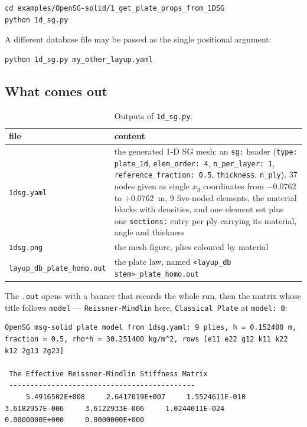 \begin{lstlisting}[style=shellst]
cd examples/OpenSG-solid/1_get_plate_props_from_1DSG
python 1d_sg.py
\end{lstlisting}

A different database file may be passed as the single positional argument:

\begin{lstlisting}[style=shellst]
python 1d_sg.py my_other_layup.yaml
\end{lstlisting}

\subsection{What comes out}

\begin{table}[htbp]
\centering
\small
\begin{tabular}{lp{9.6cm}}
\toprule
file & content \\
\midrule
\texttt{1dsg.yaml} & the generated 1-D SG mesh: an \texttt{sg:} header
  (\texttt{type: plate\_1d}, \texttt{elem\_order: 4}, \texttt{n\_per\_layer: 1},
  \texttt{reference\_fraction: 0.5}, \texttt{thickness}, \texttt{n\_ply}), 37
  nodes given as single $x_3$ coordinates from $-0.0762$ to $+0.0762$~m, 9
  five-noded elements, the material blocks with densities, and one element set
  plus one \texttt{sections:} entry per ply carrying its material, angle and
  thickness \\
\texttt{1dsg.png} & the mesh figure, plies coloured by material \\
\texttt{layup\_db\_plate\_homo.out} & the plate law, named
  \texttt{<layup\_db stem>\_plate\_homo.out} \\
\bottomrule
\end{tabular}
\caption{Outputs of \texttt{1d\_sg.py}.}
\label{tab:solid-ex1out}
\end{table}

The \texttt{.out} opens with a banner that records the whole run, then the
matrix whose title follows \texttt{model} --- \texttt{Reissner-Mindlin}
here, \texttt{Classical Plate} at \texttt{model: 0}:

\begin{lstlisting}[style=shellst,basicstyle=\ttfamily\tiny,breaklines=true]
 OpenSG msg-solid plate model from 1dsg.yaml: 9 plies, h = 0.152400 m, fraction = 0.5, rho*h = 30.251400 kg/m^2, rows [e11 e22 g12 k11 k22 k12 2g13 2g23]

 The Effective Reissner-Mindlin Stiffness Matrix
 --------------------------------------------
     5.4916502E+008     2.6417019E+007     1.5524611E-010     3.6182957E-006     3.6122933E-006     1.0244011E-024     0.0000000E+000     0.0000000E+000
\end{lstlisting}

